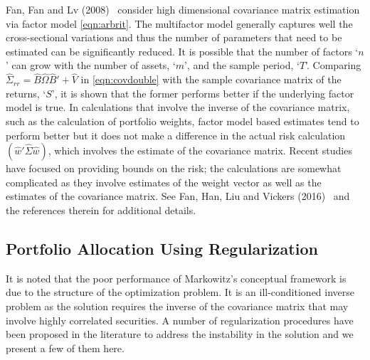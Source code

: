 Fan, Fan and Lv (2008)~\cite{fansq} consider high dimensional covariance matrix estimation via factor model \eqref{eqn:arbrit}. The multifactor model generally captures well the cross-sectional variations and thus the number of parameters that need to be estimated can be significantly reduced. It is possible that the number of factors `$n$' can grow with the number of assets, `$m$', and the sample period, `$T$'. Comparing $\hat{\Sigma}_{rr}= \hat{B} \hat{\Omega} \hat{B}' + \hat{V}$ in \eqref{eqn:covdouble} with the sample covariance matrix of the returns, `$S$', it is shown that the former performs better if the underlying factor model is true. In calculations that involve the inverse of the covariance matrix, such as the calculation of portfolio weights, factor model based estimates tend to perform better but it does not make a difference in the actual risk calculation $(\hat{w}' \hat{\Sigma} \hat{w})$, which involves the estimate of the covariance matrix. Recent studies have focused on providing bounds on the risk; the calculations are somewhat complicated as they involve estimates of the weight vector as well as the estimates of the covariance matrix. See Fan, Han, Liu and Vickers (2016)~\cite{vickers} and the references therein for additional details.



\subsection{Portfolio Allocation Using Regularization}


It is noted that the poor performance of Markowitz's conceptual framework is due to the structure of the optimization problem. It is an ill-conditioned inverse problem as the solution requires the inverse of the covariance matrix that may involve highly correlated securities. A number of regularization procedures have been proposed in the literature to address the instability in the solution and we present a few of them here. \twomedskip


